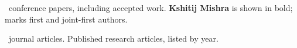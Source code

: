 
\newpage
{}
{\small \ConferenceCount\ conference papers, including accepted work. \textbf{Kshitij Mishra} is shown in bold;  marks first and joint-first authors.}\par\vspace{7pt}

\newpage
{}

{\small \JournalCount\ journal articles. Published research articles, listed by year.}\par\vspace{5pt}


